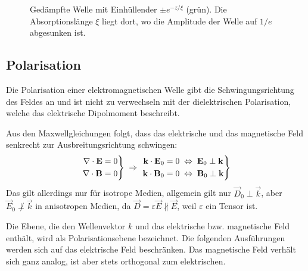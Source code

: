 \begin{figure}[htb]
    \centering
    \tfigDampeningElectromagneticWave
    \caption{Gedämpfte Welle mit Einhüllender $\pm e^{-z/\xi}$ (grün). Die Absorptionslänge $\xi$ liegt dort, wo die Amplitude der Welle auf $1/e$ abgesunken ist. }
    \label{fig:daempfung_em_welle}
\end{figure}


\subsection{Polarisation}

Die Polarisation einer elektromagnetischen Welle gibt die Schwingungsrichtung des Feldes an und ist nicht zu verwechseln mit der dielektrischen Polarisation, welche das elektrische Dipolmoment beschreibt.

Aus den Maxwellgleichungen folgt, dass das elektrische und das magnetische Feld senkrecht zur Ausbreitungsrichtung schwingen:
\begin{align*}
    \left. \begin{aligned} \nabla\cdot \mathbf{E} &=0 \\ \nabla\cdot \mathbf{B} &= 0\end{aligned} \right\} \;\Rightarrow\; \left. \begin{aligned} \mathbf{k}\cdot\mathbf{E}_0&=0\;\Leftrightarrow\; \mathbf{E}_0\perp\mathbf{k} \\ \mathbf{k}\cdot\mathbf{B}_0&=0\;\Leftrightarrow\;\mathbf{B}_0\perp\mathbf{k}\end{aligned}\right\}
\end{align*}
Das gilt allerdings nur für isotrope Medien, allgemein gilt nur $\vec D_0 \perp\vec k$, aber $\vec E_0 \not\perp\vec k$ in anisotropen Medien, da $\vec D=\varepsilon\vec E \nparallel\vec E$, weil $\varepsilon$ ein Tensor ist.

Die Ebene, die den Wellenvektor $k$ und das elektrische bzw. magnetische Feld enthält, wird als Polarisationsebene bezeichnet.
Die folgenden Ausführungen werden sich auf das elektrische Feld beschränken.
Das magnetische Feld verhält sich ganz analog, ist aber stets orthogonal zum elektrischen.

